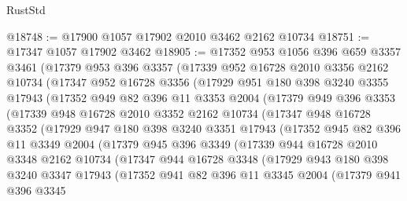 \begin{lexlean}{RustStd}
\begin{coremodule}
@18748 := @17900 @1057 @17902 @2010 @3462 @2162 @10734
@18751 := @17347 @1057 @17902 @3462
@18905 := @17352
    @953
    @1056
    @396
    @659
    @3357
    @3461
    (@17379
      @953
      @396
      @3357
      (@17339
        @952
        @16728
        @2010
        @3356
        @2162
        @10734
        (@17347
          @952
          @16728
          @3356
          (@17929
            @951
            @180
            @398
            @3240
            @3355
            @17943
            (@17352
              @949
              @82
              @396
              @11
              @3353
              @2004
              (@17379
                @949
                @396
                @3353
                (@17339
                  @948
                  @16728
                  @2010
                  @3352
                  @2162
                  @10734
                  (@17347
                    @948
                    @16728
                    @3352
                    (@17929
                      @947
                      @180
                      @398
                      @3240
                      @3351
                      @17943
                      (@17352
                        @945
                        @82
                        @396
                        @11
                        @3349
                        @2004
                        (@17379
                          @945
                          @396
                          @3349
                          (@17339
                            @944
                            @16728
                            @2010
                            @3348
                            @2162
                            @10734
                            (@17347
                              @944
                              @16728
                              @3348
                              (@17929
                                @943
                                @180
                                @398
                                @3240
                                @3347
                                @17943
                                (@17352
                                  @941
                                  @82
                                  @396
                                  @11
                                  @3345
                                  @2004
                                  (@17379
                                    @941
                                    @396
                                    @3345

\end{coremodule}
\end{lexlean}
